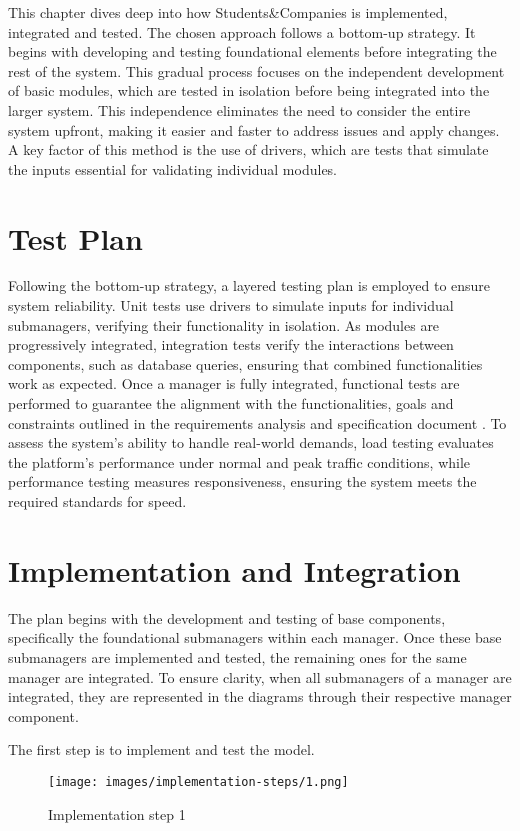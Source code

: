This chapter dives deep into how Students\&Companies is implemented, integrated and tested.
The chosen approach follows a bottom-up strategy.
It begins with developing and testing foundational elements before integrating the rest of the system.
This gradual process focuses on the independent development of basic modules, which are tested in isolation before being integrated into the larger system.
This independence eliminates the need to consider the entire system upfront, making it easier and faster to address issues and apply changes.
A key factor of this method is the use of drivers, which are tests that simulate the inputs essential for validating individual modules.

\section{Test Plan}
Following the bottom-up strategy, a layered testing plan is employed to ensure system reliability.
Unit tests use drivers to simulate inputs for individual submanagers, verifying their functionality in isolation.
As modules are progressively integrated, integration tests verify the interactions between components, such as database queries, ensuring that combined functionalities work as expected.
Once a manager is fully integrated, functional tests are performed to guarantee the alignment with the functionalities, goals and constraints outlined in the requirements analysis and specification document \cite{carraracurrodossi2024}.
To assess the system's ability to handle real-world demands, load testing evaluates the platform's performance under normal and peak traffic conditions, while performance testing measures responsiveness, ensuring the system meets the required standards for speed.

\section{Implementation and Integration}
The plan begins with the development and testing of base components, specifically the foundational submanagers within each manager.
Once these base submanagers are implemented and tested, the remaining ones for the same manager are integrated. 
To ensure clarity, when all submanagers of a manager are integrated, they are represented in the diagrams through their respective manager component.

\clearpage
The first step is to implement and test the model.

\begin{figure}[h]
    \centering
    \texttt{[image: images/implementation-steps/1.png]}
    \caption{Implementation step 1}
\end{figure}

